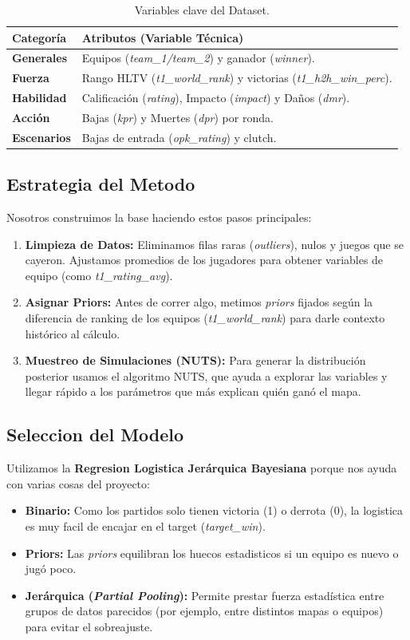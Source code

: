 \documentclass[twocolumn,10pt]{article}
\begin{document}
\begin{table}[!ht]
\centering
\caption{Variables clave del Dataset.}
\label{tab:data_dictionary}
\begin{tabular}{lp{5.2cm}}
\toprule
\textbf{Categoría} & \textbf{Atributos (Variable Técnica)} \\
\midrule
\textbf{Generales} & Equipos (\textit{team\_1/team\_2}) y ganador (\textit{winner}). \\
\textbf{Fuerza} & Rango HLTV (\textit{t1\_world\_rank}) y victorias (\textit{t1\_h2h\_win\_perc}). \\
\textbf{Habilidad} & Calificación (\textit{rating}), Impacto (\textit{impact}) y Daños (\textit{dmr}). \\
\textbf{Acción} & Bajas (\textit{kpr}) y Muertes (\textit{dpr}) por ronda. \\
\textbf{Escenarios} & Bajas de entrada (\textit{opk\_rating}) y clutch. \\
\bottomrule
\end{tabular}
\end{table}

\subsection{Estrategia del Metodo}
Nosotros construimos la base haciendo estos pasos principales:
\begin{enumerate}
    \item \textbf{Limpieza de Datos:} Eliminamos filas raras (\textit{outliers}), nulos y juegos que se cayeron. Ajustamos promedios de los jugadores para obtener variables de equipo (como \textit{t1\_rating\_avg}).
    \item \textbf{Asignar Priors:} Antes de correr algo, metimos \textit{priors} fijados según la diferencia de ranking de los equipos (\textit{t1\_world\_rank}) para darle contexto histórico al cálculo.
    \item \textbf{Muestreo de Simulaciones (NUTS):} Para generar la distribución posterior usamos el algoritmo NUTS, que ayuda a explorar las variables y llegar rápido a los parámetros que más explican quién ganó el mapa.
\end{enumerate}

\subsection{Seleccion del Modelo}
Utilizamos la \textbf{Regresion Logistica Jerárquica Bayesiana} porque nos ayuda con varias cosas del proyecto:
\begin{itemize}
    \item \textbf{Binario:} Como los partidos solo tienen victoria (1) o derrota (0), la logistica es muy facil de encajar en el target (\textit{target\_win}).
    \item \textbf{Priors:} Las \textit{priors} equilibran los huecos estadisticos si un equipo es nuevo o jugó poco.
    \item \textbf{Jerárquica (\textit{Partial Pooling}):} Permite prestar fuerza estadística entre grupos de datos parecidos (por ejemplo, entre distintos mapas o equipos) para evitar el sobreajuste.
\end{itemize}
\end{document}

